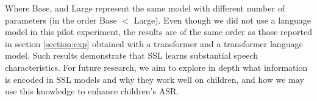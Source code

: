 Where Base, and Large represent the same model with different number of parameters (in the order Base $<$ Large).
Even though we did not use a language model in this pilot experiment, the results are of the same order as those reported in section \ref{section:exp} obtained with a transformer and a transformer language model. Such results demonstrate that SSL learns substantial speech characteristics. For future research, we aim to explore in depth what information is encoded in SSL models and why they work well on children, and how we may use this knowledge to enhance children's ASR.
